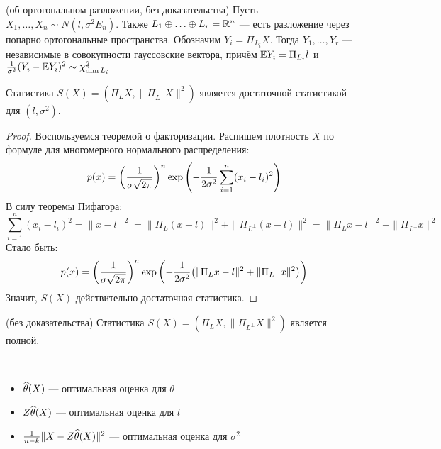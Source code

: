 \begin{theorem} (об ортогональном разложении, без доказательства)
	Пусть $X_1, \ldots, X_n \sim N(l, \sigma^2 E_n)$. Также $L_1 \oplus \ldots \oplus L_r = \mathbb{R}^n$ --- есть разложение через попарно ортогональные пространства. Обозначим $Y_i = \Pi_{L_i} X$. Тогда $Y_1, \ldots, Y_r$ --- независимые в совокупности гауссовские вектора, причём $\mathbb{E} Y_i = \Pi_{L_i} l$ и $\frac{1}{\sigma^2}(Y_i - \mathbb{E} Y_i)^2 \sim \chi_{\dim L_i}^2$
\end{theorem}

\begin{proposition}
	Статистика $S(X) = (\Pi_L X, \|\Pi_{L^\bot} X\|^2)$ является достаточной статистикой для $(l, \sigma^2)$.
\end{proposition}

\begin{proof}
	Воспользуемся теоремой о факторизации. Распишем плотность $X$ по формуле для многомерного нормального распределения:
	\[
		p(x) = \left(\frac{1}{\sigma\sqrt{2\pi}}\right)^n\exp\left(-\frac{1}{2\sigma^2}\sum_{i = 1}^n (x_i - l_i)^2\right)
	\]
	В силу теоремы Пифагора:
	\[
		\sum_{i = 1}^n (x_i - l_i)^2 = \|x - l\|^2 = \|\Pi_L (x - l)\|^2 + \|\Pi_{L^\bot} (x - l)\|^2 = \|\Pi_L x - l\|^2 + \|\Pi_{L^\bot} x\|^2
 	\]
 	Стало быть:
	\[
	 	p(x) = \left(\frac{1}{\sigma\sqrt{2\pi}}\right)^n\exp\left(-\frac{1}{2\sigma^2}\big(\|\Pi_L x - l\|^2 + \|\Pi_{L^\bot} x\|^2\big)\right)
	\]
	Значит, $S(X)$ действительно достаточная статистика.
\end{proof}

\begin{theorem} (без доказательства)
	Статистика $S(X) = (\Pi_L X, \|\Pi_{L^\bot} X\|^2)$ является полной.
\end{theorem}

\begin{corollary}~
	\begin{itemize}
		\item $\widehat{\theta}(X)$ --- оптимальная оценка для $\theta$
		
		\item $Z\widehat{\theta}(X)$ --- оптимальная оценка для $l$
		
		\item $\frac{1}{n - k}\|X - Z\widehat{\theta}(X)\|^2$ --- оптимальная оценка для $\sigma^2$
	\end{itemize}
\end{corollary}

